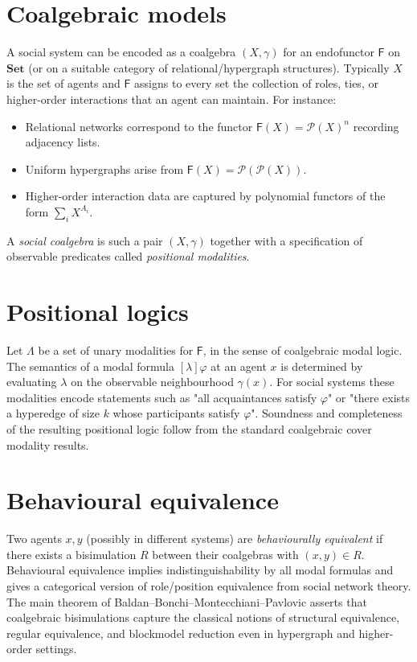 \documentclass[12pt]{article}
\newcommand{\Set}{\mathbf{Set}}
\newcommand{\Pow}{\mathcal{P}}
\newcommand{\Fun}{\mathsf{F}}
\begin{document}
\section*{Coalgebraic models}
A social system can be encoded as a coalgebra $(X,\gamma)$ for an endofunctor $\Fun$ on $\Set$ (or on a suitable category of relational/hypergraph structures).  Typically $X$ is the set of agents and $\Fun$ assigns to every set the collection of roles, ties, or higher-order interactions that an agent can maintain.  For instance:
\begin{itemize}
  \item Relational networks correspond to the functor $\Fun(X)=\Pow(X)^n$ recording adjacency lists.
  \item Uniform hypergraphs arise from $\Fun(X)=\Pow(\Pow(X))$.
  \item Higher-order interaction data are captured by polynomial functors of the form $\sum_{i} X^{A_i}$.
\end{itemize}
A \emph{social coalgebra} is such a pair $(X,\gamma)$ together with a specification of observable predicates called \emph{positional modalities}.

\section*{Positional logics}
Let $\Lambda$ be a set of unary modalities for $\Fun$, in the sense of coalgebraic modal logic.  The semantics of a modal formula $[\lambda] \varphi$ at an agent $x$ is determined by evaluating $\lambda$ on the observable neighbourhood $\gamma(x)$.  For social systems these modalities encode statements such as "all acquaintances satisfy $\varphi$" or "there exists a hyperedge of size $k$ whose participants satisfy $\varphi$".  Soundness and completeness of the resulting positional logic follow from the standard coalgebraic cover modality results.

\section*{Behavioural equivalence}
Two agents $x,y$ (possibly in different systems) are \emph{behaviourally equivalent} if there exists a bisimulation $R$ between their coalgebras with $(x,y)\in R$.  Behavioural equivalence implies indistinguishability by all modal formulas and gives a categorical version of role/position equivalence from social network theory.  The main theorem of Baldan--Bonchi--Montecchiani--Pavlovic asserts that coalgebraic bisimulations capture the classical notions of structural equivalence, regular equivalence, and blockmodel reduction even in hypergraph and higher-order settings.
\end{document}
